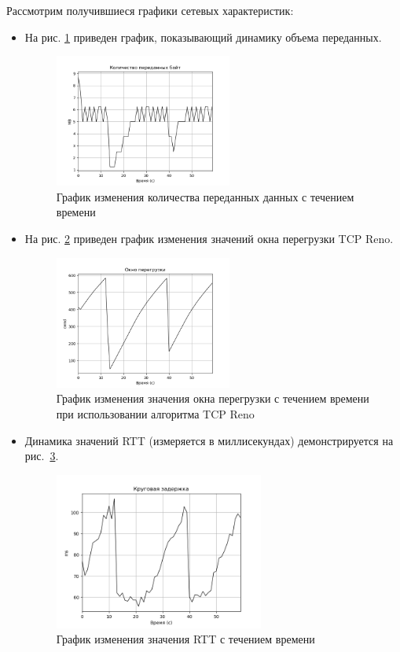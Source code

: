 Рассмотрим получившиеся графики сетевых характеристик:
\begin{itemize}
\item На рис. \ref{fig:30005} приведен график, показывающий динамику
  объема переданных.

  \begin{figure}[H]
  \centering
  \includegraphics[width=0.55\textwidth]{image/ch03_01/bytes.png}
\caption{График изменения количества переданных данных с течением
  времени}
\label{fig:30005}
\end{figure}

\item На рис. \ref{fig:30006} приведен график изменения значений окна
  перегрузки TCP Reno.

\begin{figure}[H]
\centering
\includegraphics[width=0.55\textwidth]{image/ch03_01/cwnd.png}
\caption{График изменения значения окна перегрузки с течением времени
  при использовании алгоритма TCP Reno}\label{fig:30006}
\end{figure}


\item Динамика значений RTT (измеряется в миллисекундах)
  демонстрируется на рис.~\ref{fig:30007}.

\begin{figure}[H]
\centering
\includegraphics[width=0.65\textwidth]{image/ch03_01/rtt.png}
\caption{График изменения значения RTT с течением
времени}\label{fig:30007}
\end{figure}



\end{itemize}
